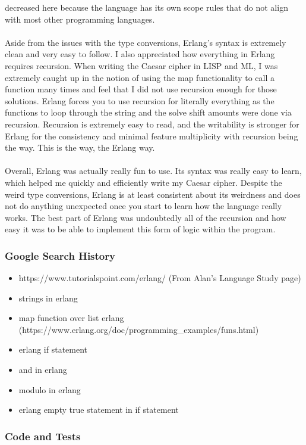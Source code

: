 \documentclass[letterpaper, 10pt, DIV=13]{scrartcl}
\numberwithin{equation}{section}
\numberwithin{figure}{section}
\numberwithin{table}{section}
\begin{document}
decreased here because the language has its own scope rules that do not align with most other programming languages.
\\ \\
Aside from the issues with the type conversions, Erlang's syntax is extremely clean and very easy to follow. I also appreciated how everything in Erlang 
requires recursion. When writing the Caesar cipher in LISP and ML, I was extremely caught up in the notion of using the map functionality to call a function 
many times and feel that I did not use recursion enough for those solutions. Erlang forces you to use recursion for literally everything as the functions to
loop through the string and the solve shift amounts were done via recursion. Recursion is extremely easy to read, and the writability is stronger for Erlang 
for the consistency and minimal feature multiplicity with recursion being the way. This is the way, the Erlang way.
\\ \\
Overall, Erlang was actually really fun to use. Its syntax was really easy to learn, which helped me quickly and efficiently write my Caesar cipher.
Despite the weird type conversions, Erlang is at least consistent about its weirdness and does not do anything unexpected once you start to learn
how the language really works. The best part of Erlang was undoubtedly all of the recursion and how easy it was to be able to implement this form of logic
within the program.

\subsubsection{Google Search History}
\begin{itemize}
    \item https://www.tutorialspoint.com/erlang/ (From Alan's Language Study page)
    \item strings in erlang
    \item map function over list erlang (https://www.erlang.org/doc/programming\_examples/funs.html)
    \item erlang if statement
    \item and in erlang
    \item modulo in erlang
    \item erlang empty true statement in if statement
\end{itemize}

\subsubsection{Code and Tests}


\end{document}

